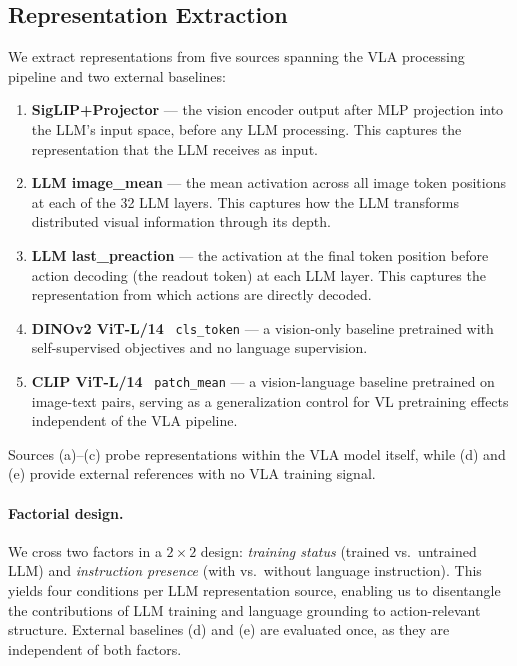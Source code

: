\subsection{Representation Extraction}
\label{sec:rep_extraction}

We extract representations from five sources spanning the VLA processing pipeline and two external baselines:

\begin{enumerate}[label=(\alph*),nosep,leftmargin=*]
    \item \textbf{SigLIP+Projector} --- the vision encoder output after MLP projection into the LLM's input space, before any LLM processing. This captures the representation that the LLM receives as input.
    \item \textbf{LLM image\_mean} --- the mean activation across all image token positions at each of the 32 LLM layers. This captures how the LLM transforms distributed visual information through its depth.
    \item \textbf{LLM last\_preaction} --- the activation at the final token position before action decoding (the readout token) at each LLM layer. This captures the representation from which actions are directly decoded.
    \item \textbf{DINOv2 ViT-L/14}~\cite{oquab2024_dinov2} \texttt{cls\_token} --- a vision-only baseline pretrained with self-supervised objectives and no language supervision.
    \item \textbf{CLIP ViT-L/14}~\cite{radford2021_clip} \texttt{patch\_mean} --- a vision-language baseline pretrained on image-text pairs, serving as a generalization control for VL pretraining effects independent of the VLA pipeline.
\end{enumerate}

Sources (a)--(c) probe representations within the VLA model itself, while (d) and (e) provide external references with no VLA training signal.

\paragraph{Factorial design.}
We cross two factors in a $2 \times 2$ design: \emph{training status} (trained vs.\ untrained LLM) and \emph{instruction presence} (with vs.\ without language instruction).
This yields four conditions per LLM representation source, enabling us to disentangle the contributions of LLM training and language grounding to action-relevant structure.
External baselines (d) and (e) are evaluated once, as they are independent of both factors.

